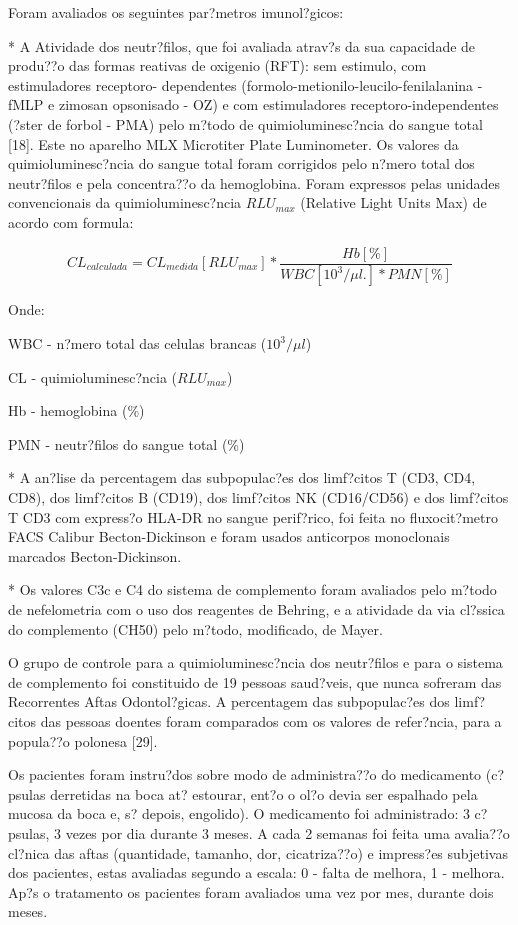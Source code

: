 \documentclass[12pt]{article}
\begin{document}
 Foram avaliados os seguintes par?metros imunol?gicos:

 * A Atividade dos neutr?filos, que  foi avaliada atrav?s da sua capacidade de
produ??o das formas reativas de oxigenio (RFT): sem estimulo, com estimuladores
receptoro- dependentes (formolo-metionilo-leucilo-fenilalanina - fMLP e zimosan
opsonisado - OZ) e com estimuladores receptoro-independentes (?ster de forbol -
PMA) pelo m?todo de quimioluminesc?ncia do sangue total [18]. Este no aparelho
MLX Microtiter Plate Luminometer. Os valores da quimioluminesc?ncia do sangue
total foram corrigidos pelo n?mero total dos neutr?filos e pela concentra??o da
hemoglobina. Foram expressos pelas unidades convencionais da
quimioluminesc?ncia $RLU_{max}$ (Relative Light Units Max) de acordo com formula:

\begin{equation}
CL_{calculada} = CL_{medida}[RLU_{max}]*\frac{Hb[\%]}{WBC[10^3/\mu l.]*PMN[\%]}
\end{equation}

Onde:

WBC -   n?mero total das celulas brancas ($10^3/\mu l$)

CL  -   quimioluminesc?ncia ($RLU_{max}$)

Hb  -   hemoglobina (\%)

PMN -   neutr?filos do sangue total (\%)

 * A an?lise da percentagem das subpopulac?es dos limf?citos T (CD3, CD4, CD8),
dos limf?citos B (CD19), dos limf?citos NK (CD16/CD56) e dos limf?citos T CD3
com express?o HLA-DR no sangue perif?rico, foi feita no fluxocit?metro FACS
Calibur Becton-Dickinson e foram usados anticorpos monoclonais marcados
Becton-Dickinson.

 * Os valores C3c e C4 do sistema de complemento foram avaliados pelo m?todo de
nefelometria com o uso dos reagentes de Behring, e a atividade da via cl?ssica
do complemento (CH50) pelo m?todo, modificado, de Mayer.

 O grupo de controle para a quimioluminesc?ncia dos neutr?filos e para o
sistema de complemento foi constituido de 19 pessoas saud?veis, que nunca
sofreram das Recorrentes Aftas Odontol?gicas. A percentagem das subpopulac?es
dos limf?citos das pessoas doentes foram comparados com os valores de
refer?ncia, para a popula??o polonesa [29].

 Os pacientes foram instru?dos sobre modo de administra??o do medicamento
(c?psulas derretidas na boca at? estourar, ent?o o ol?o devia ser espalhado
pela mucosa da boca e, s? depois, engolido). O medicamento foi administrado: 3
c?psulas, 3 vezes por dia durante 3 meses.  A cada 2 semanas foi feita uma
avalia??o cl?nica das aftas (quantidade, tamanho, dor, cicatriza??o) e
impress?es subjetivas dos pacientes, estas avaliadas segundo a  escala: 0 -
falta de melhora, 1 - melhora. Ap?s o tratamento os pacientes foram avaliados
uma vez por mes, durante dois meses.
\end{document}
